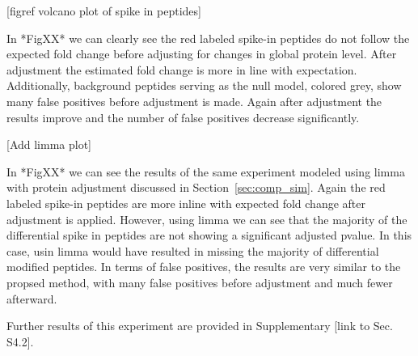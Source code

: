 \documentclass[mcp]{article}
\numberwithin{figure}{section} %
\numberwithin{table}{section}
\def\todo#1{{\color{red}[#1]}}
\begin{document}
\todo{figref volcano plot of spike in peptides}

In *FigXX* we can clearly see the red labeled spike-in peptides do not follow the expected fold change before adjusting for changes in global protein level. After adjustment the estimated fold change is more in line with expectation. Additionally, background peptides serving as the null model, colored grey, show many false positives before adjustment is made. Again after adjustment the results improve and the number of false positives decrease significantly. 

\todo{Add limma plot}

In *FigXX* we can see the results of the same experiment modeled using limma with protein adjustment discussed in Section~\ref{sec:comp_sim}. Again the red labeled spike-in peptides are more inline with expected fold change after adjustment is applied. However, using limma we can see that the majority of the differential spike in peptides are not showing a significant adjusted pvalue. In this case, usin limma would have resulted in missing the majority of differential modified peptides.  In terms of false positives, the results are very similar to the propsed method, with many false positives before adjustment and much fewer afterward.

Further results of this experiment are provided in Supplementary \todo{link to Sec. S4.2}. 


\end{document}
